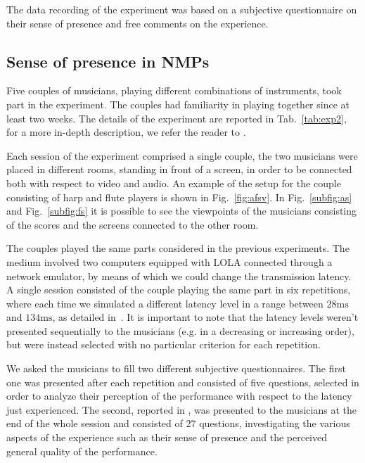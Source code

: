 The data recording of the experiment was based on a subjective questionnaire on their sense of presence and free comments on the experience. 





\subsection{Sense of presence in NMPs}
Five couples of musicians, playing different combinations of instruments, took part in the experiment. The couples had familiarity in playing together since at least two weeks. The details of the experiment are reported in Tab.~\ref{tab:exp2}, for a more in-depth description, we refer the reader to \cite{CIM2018}.

Each session of the experiment comprised a single couple, the two musicians were placed in different rooms, standing in front of a screen, in order to be connected both with respect to video and audio. An example of the setup for the couple consisting of harp and flute players is shown in Fig.~\ref{fig:afsv}. In Fig.~\ref{subfig:as} and Fig.~\ref{subfig:fs} it is possible to see the viewpoints of the musicians consisting of the scores and the screens connected to the other room. 

The couples played the same parts considered in the previous experiments. The medium involved two computers equipped with LOLA connected through a network emulator, by means of which we could change the transmission latency. A single session consisted of the couple playing the same part in six repetitions, where each time we simulated a different latency level in a range between $28\mathrm{ms}$ and $134\mathrm{ms}$, as detailed in~\cite{CIM2018}. It is important to note that the latency levels weren't presented sequentially to the musicians (e.g. in a decreasing or increasing order), but were instead selected with no particular criterion for each repetition.

We asked the musicians to fill two different subjective questionnaires. The first one was presented after each repetition and consisted of five questions, selected in order to analyze their perception of the performance with respect to the latency just experienced. The second, reported in \cite{CIM2018}, was presented to the musicians at the end of the whole session and consisted of 27 questions, investigating the various aspects of the experience such as their sense of presence and the perceived general quality of the performance. %



